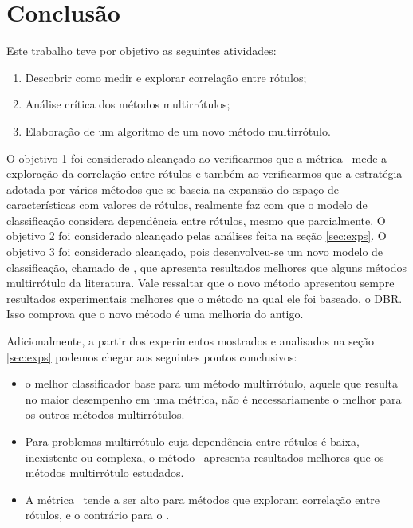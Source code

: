 



\FloatBarrier



\chapter{Conclusão}
\label{sec:conclusions}

Este trabalho teve por objetivo as seguintes atividades:
\begin{enumerate}
 \item Descobrir como medir e explorar correlação entre rótulos;
 \item Análise crítica dos métodos multirrótulos;
 \item Elaboração de um algoritmo de um novo método multirrótulo.
\end{enumerate}
O objetivo 1 foi considerado alcançado ao verificarmos que a métrica \SA~mede a 
exploração da correlação entre rótulos e também ao verificarmos que a estratégia adotada por vários 
métodos que se baseia na expansão do espaço de características com valores de rótulos, realmente
faz com que o modelo de classificação considera dependência entre rótulos, mesmo que parcialmente.
O objetivo 2 foi considerado alcançado pelas análises feita na seção \ref{sec:exps}.
O objetivo 3 foi considerado alcançado, pois desenvolveu-se um novo modelo de classificação,
chamado de \MRLM, que apresenta resultados melhores que alguns métodos multirrótulo da literatura.
Vale ressaltar que o novo método apresentou sempre resultados experimentais melhores que o método na qual
ele foi baseado, o DBR. Isso comprova que o novo método é uma melhoria do antigo.

Adicionalmente, a partir dos experimentos mostrados e analisados na seção \ref{sec:exps} podemos
chegar aos seguintes pontos conclusivos:
  \begin{itemize}
   \item o melhor classificador base para um método multirrótulo, aquele que resulta no maior desempenho em uma métrica,
   não é necessariamente o melhor para os outros métodos multirrótulos. 
   \item Para problemas multirrótulo cuja dependência entre rótulos é baixa, inexistente ou complexa, o
   método \BR~apresenta resultados melhores que os métodos multirrótulo estudados.
   \item A métrica \SA~tende a ser alto para métodos que exploram correlação entre rótulos, e o contrário
   para o \HL.
  \end{itemize}


  
